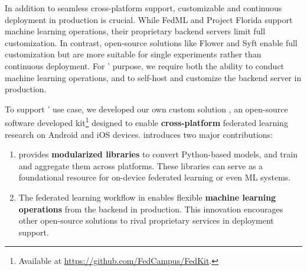 In addition to seamless cross-platform support,
customizable and continuous deployment in production is crucial.
While FedML and Project Florida support machine learning operations,
their proprietary backend servers limit full customization.
In contrast, open-source solutions like Flower and Syft enable
full customization
but are more suitable for single experiments rather than continuous deployment.
For \fedcampus' purpose,
we require both the ability to conduct machine learning operations,
and to self-host and customize the backend server in production.

To support \fedcampus' use case, we developed our own custom solution \fedkit,
an open-source software developed kit\footnote{
    Available at \url{https://github.com/FedCampus/FedKit}.
} designed to enable \textbf{cross-platform}
federated learning research on Android and iOS devices.
\fedkit introduces two major contributions:

\begin{enumerate}
\item \fedkit provides \textbf{modularized libraries} to convert Python-based models,
    and train and aggregate them across platforms.
    These libraries can serve as a foundational resource for
    on-device federated learning or even ML systems.
\item The federated learning workflow in \fedkit
    enables flexible \textbf{machine learning operations} from
    the backend in production.
    This innovation encourages other open-source solutions to
    rival proprietary services in deployment support.
\end{enumerate}
